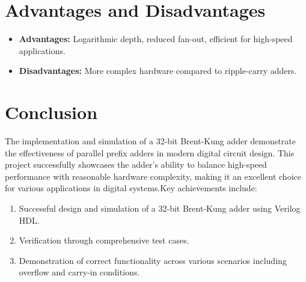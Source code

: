 \documentclass{IEEEtran}
\begin{document}
\begin{table}[h]
    \centering
    \renewcommand{\arraystretch}{1.2}
    \caption{Adder Metadata: Technology Node and Citations}
    \label{tab:adder_metadata}
\end{table}




\section{Advantages and Disadvantages}
\begin{itemize}
    \item \textbf{Advantages:} Logarithmic depth, reduced fan-out, efficient for high-speed applications.
    \item \textbf{Disadvantages:} More complex hardware compared to ripple-carry adders.
\end{itemize}






\section{Conclusion}
The implementation and simulation of a 32-bit Brent-Kung adder demonstrate the effectiveness of parallel prefix adders in modern digital circuit design. This project successfully showcases the adder's ability to balance high-speed performance with reasonable hardware complexity, making it an excellent choice for various applications in digital systems.Key achievements include:
\begin{enumerate}
    \item Successful design and simulation of a 32-bit Brent-Kung adder using Verilog HDL.
    \item Verification through comprehensive test cases.
    \item Demonstration of correct functionality across various scenarios including overflow and carry-in conditions.
\end{enumerate}
\end{document}

